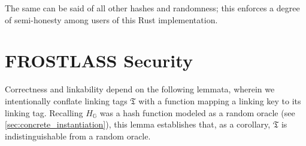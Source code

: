 \documentclass[11pt]{article}
\theoremstyle{definition}
\newcommand{\G}{\mathbb{G}}
\begin{document}
The same can be said of all other hashes and randomness; this enforces a degree of semi-honesty among users of this Rust implementation.



\section{FROSTLASS Security}


Correctness and linkability depend on the following lemmata, wherein we intentionally conflate linking tags $\mathfrak{T}$ with a function mapping a linking key to its linking tag. Recalling $H_{\G}$ was a hash function modeled as a random oracle (see \cref{sec:concrete_instantiation}), this lemma establishes that, as a corollary, $\mathfrak{T}$ is indistinguishable from a random oracle.
\end{document}
